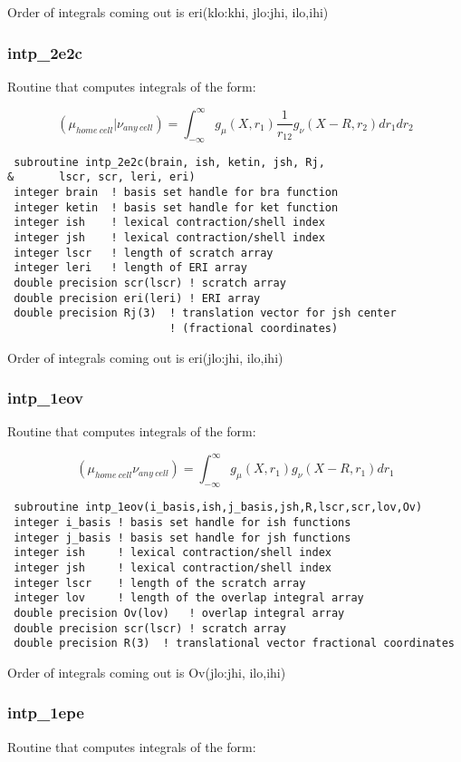 Order of integrals coming out is eri(klo:khi, jlo:jhi, ilo,ihi)

\subsubsection{intp\_2e2c}
Routine that computes integrals of the form:

\[
({\mu}_{home~cell}|{\nu}_{any~cell}) = \int_{-\infty}^{\infty} g_{\mu}(X,r_{1})\frac{1}{r_{12}}g_{\nu}(X-R,r_{2})dr_{1}dr_{2}
\]

\begin{verbatim}
 subroutine intp_2e2c(brain, ish, ketin, jsh, Rj,
&       lscr, scr, leri, eri)
 integer brain  ! basis set handle for bra function
 integer ketin  ! basis set handle for ket function
 integer ish    ! lexical contraction/shell index
 integer jsh    ! lexical contraction/shell index
 integer lscr   ! length of scratch array
 integer leri   ! length of ERI array
 double precision scr(lscr) ! scratch array 
 double precision eri(leri) ! ERI array
 double precision Rj(3)  ! translation vector for jsh center 
                         ! (fractional coordinates)
\end{verbatim}

Order of integrals coming out is eri(jlo:jhi, ilo,ihi)

\subsubsection{intp\_1eov}
Routine that computes integrals of the form:

\[
({\mu}_{home~cell}{\nu}_{any~cell}) = \int_{-\infty}^{\infty} g_{\mu}(X,r_{1})g_{\nu}(X-R,r_{1})dr_{1}
\]

\begin{verbatim}
 subroutine intp_1eov(i_basis,ish,j_basis,jsh,R,lscr,scr,lov,Ov)
 integer i_basis ! basis set handle for ish functions
 integer j_basis ! basis set handle for jsh functions
 integer ish     ! lexical contraction/shell index
 integer jsh     ! lexical contraction/shell index
 integer lscr    ! length of the scratch array
 integer lov     ! length of the overlap integral array
 double precision Ov(lov)   ! overlap integral array
 double precision scr(lscr) ! scratch array
 double precision R(3)  ! translational vector fractional coordinates
\end{verbatim}

Order of integrals coming out is Ov(jlo:jhi, ilo,ihi)


\subsubsection{intp\_1epe}
Routine that computes integrals of the form:

